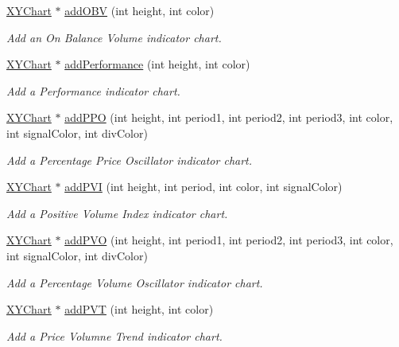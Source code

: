 \begin{DoxyCompactItemize}
\hyperlink{class_x_y_chart}{X\+Y\+Chart} $\ast$ \hyperlink{class_finance_chart_a68954d093f52671623132c5fb35c261b}{add\+O\+BV} (int height, int color)
\begin{DoxyCompactList}\small\item\em Add an On Balance Volume indicator chart. \end{DoxyCompactList}\item 
\hyperlink{class_x_y_chart}{X\+Y\+Chart} $\ast$ \hyperlink{class_finance_chart_a86b3b47168753b4876b38464ecc5ab33}{add\+Performance} (int height, int color)
\begin{DoxyCompactList}\small\item\em Add a Performance indicator chart. \end{DoxyCompactList}\item 
\hyperlink{class_x_y_chart}{X\+Y\+Chart} $\ast$ \hyperlink{class_finance_chart_afece1b137b4d8b68e0be8255a2a914b9}{add\+P\+PO} (int height, int period1, int period2, int period3, int color, int signal\+Color, int div\+Color)
\begin{DoxyCompactList}\small\item\em Add a Percentage Price Oscillator indicator chart. \end{DoxyCompactList}\item 
\hyperlink{class_x_y_chart}{X\+Y\+Chart} $\ast$ \hyperlink{class_finance_chart_a69528f7f5ec33d01dacee72fd0fe2357}{add\+P\+VI} (int height, int period, int color, int signal\+Color)
\begin{DoxyCompactList}\small\item\em Add a Positive Volume Index indicator chart. \end{DoxyCompactList}\item 
\hyperlink{class_x_y_chart}{X\+Y\+Chart} $\ast$ \hyperlink{class_finance_chart_ace44d0253016161a1bd17d9725fde444}{add\+P\+VO} (int height, int period1, int period2, int period3, int color, int signal\+Color, int div\+Color)
\begin{DoxyCompactList}\small\item\em Add a Percentage Volume Oscillator indicator chart. \end{DoxyCompactList}\item 
\hyperlink{class_x_y_chart}{X\+Y\+Chart} $\ast$ \hyperlink{class_finance_chart_a3434485481a3f184521145874a62224a}{add\+P\+VT} (int height, int color)
\begin{DoxyCompactList}\small\item\em Add a Price Volumne Trend indicator chart. \end{DoxyCompactList}\item 

\end{DoxyCompactItemize}

